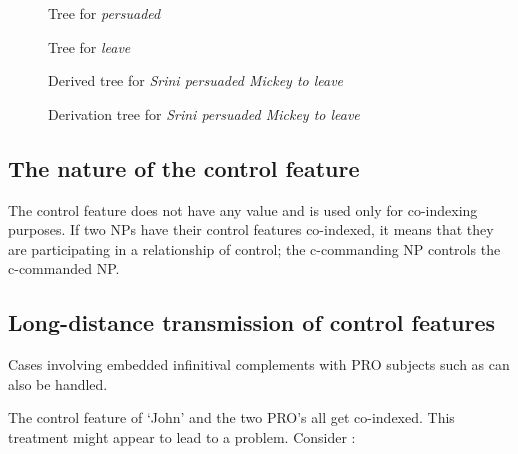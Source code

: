 \begin{figure}[hbt]
\centering
\hspace{0.0in}
\caption{Tree for {\it persuaded}}
\label{persuade-tree}
\end{figure}

\begin{figure}[hbt]
\centering
\hspace{0.0in}
\caption{Tree for {\it leave}}
\label{leave-tree}
\end{figure}

\begin{figure}[hbt]
\centering
\hspace{0.0in}
\caption{Derived tree for {\it Srini persuaded Mickey to leave}}
\label{derived-tree}
\end{figure}

\begin{figure}[hbt]
\centering
\hspace{0.0in}
\caption{Derivation tree for {\it Srini persuaded Mickey to leave}}
\label{derivation-tree}
\end{figure}


\subsection{The nature of the control feature}
The control feature does not have any value and is used only for
co-indexing purposes. If two NPs have their control features
co-indexed, it means that they are participating in a relationship
of control; the c-commanding NP controls the c-commanded NP. 

\subsection{Long-distance transmission of control features}
Cases involving embedded infinitival complements with PRO subjects such as
 can also be handled.


The control feature of `John' and the two PRO's all get co-indexed.
This treatment might appear to lead to a problem. Consider :

